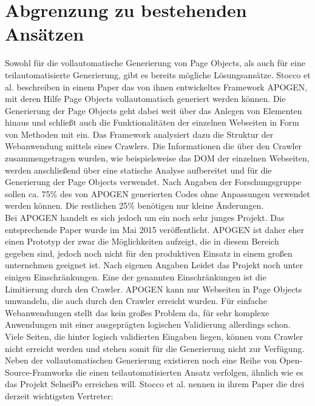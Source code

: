 \section{Abgrenzung zu bestehenden Ansätzen}
\label{sec:abgrenzung_zu_bestehenden_ansaetzen}
Sowohl für die vollautomatische Generierung von Page Objects, als auch für eine teilautomatisierte Generierung, gibt es bereits mögliche Lösungsansätze. 
Stocco et al. \cite{stocco_why_2015} beschreiben in einem Paper das von ihnen entwickeltes Framework APOGEN, mit deren Hilfe Page Objects vollautomatisch generiert werden können. Die Generierung der Page Objects geht dabei weit über das Anlegen von Elementen hinaus und schließt auch die Funktionalitäten der einzelnen Webseiten in Form von Methoden mit ein.
Das Framework analysiert dazu die Struktur der Webanwendung mittels eines Crawlers. Die Informationen die über den Crawler zusammengetragen wurden, wie beispielsweise das DOM der einzelnen Webseiten, werden anschließend über eine statische Analyse aufbereitet und für die Generierung der Page Objects verwendet.
Nach Angaben der Forschungsgruppe sollen ca. 75\% des von APOGEN generierten Codes ohne Anpassungen verwendet werden können. Die restlichen 25\% benötigen nur kleine Änderungen.\\
Bei APOGEN handelt es sich jedoch um ein noch sehr junges Projekt. Das entsprechende Paper wurde im Mai 2015 veröffentlicht. APOGEN ist daher eher einen Prototyp der zwar die Möglichkeiten aufzeigt, die in diesem Bereich gegeben sind, jedoch noch nicht für den produktiven Einsatz in einem großen unternehmen geeignet ist.
Nach eigenen Angaben Leidet das Projekt noch unter einigen Einschränkungen. Eine der genannten Einschränkungen ist die Limitierung durch den Crawler.
APOGEN kann nur Webseiten in Page Objects umwandeln, die auch durch den Crawler erreicht wurden.
Für einfache Webanwendungen stellt das kein großes Problem da, für sehr komplexe Anwendungen mit einer ausgeprägten logischen Validierung allerdings schon.
Viele Seiten, die hinter logisch validierten Eingaben liegen, können vom Crawler nicht erreicht werden und stehen somit für die Generierung nicht zur Verfügung.\\
Neben der vollautomatischen Generierung existieren noch eine Reihe von Open-Source-Framworks 
die einen teilautomatisierten Ansatz verfolgen, ähnlich wie es das Projekt SelneiPo erreichen will.
Stocco et al. \cite{stocco_why_2015} nennen in ihrem Paper die drei derzeit wichtigsten Vertreter:

